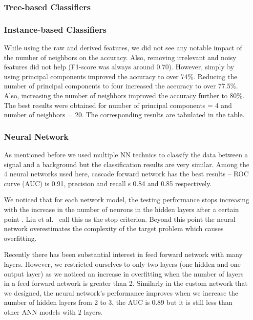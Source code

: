 \subsubsection{Tree-based Classifiers}

\subsubsection{Instance-based Classifiers}

While using the raw and derived features, we did not see any notable impact of the number of neighbors on the accuracy. Also, removing irrelevant and noisy features did not help (F1-score was always around 0.70). However, simply by using principal components improved the accuracy to over 74\%. Reducing the number of principal components to four increased the accuracy to over 77.5\%. Also, increasing the number of neighbors improved the accuracy further to 80\%. The best results were obtained for number of principal components = 4 and number of neighbors = 20. The corresponding results are tabulated in the table.

\subsubsection{Neural Network}
As mentioned before we used multiple NN technics to classify the data between a signal and a background but the classification results are very similar. Among the 4 neural networks used here, cascade forward network has the best results --  ROC curve (AUC) is 0.91, precision and recall s 0.84 and 0.85 respectively.  

We noticed that for each network model, the testing performance stops increasing with the increase in the number of neurons in the hidden layers after a certain point . Liu et al.~\cite{NN-Result} call this as the stop criterion. Beyond this point the neural network overestimates the complexity of the target problem which causes overfitting.

Recently there has been substantial interest in feed forward network with many layers. However, we restricted ourselves to only two layers (one hidden and one output layer) as we noticed an increase in overfitting when the number of layers in a feed forward network is greater than 2.  Similarly in the custom network that we designed, the neural network's performance improves when we increase the number of hidden layers from 2 to 3, the AUC is 0.89 but it is still less than other ANN models with 2 layers. 


